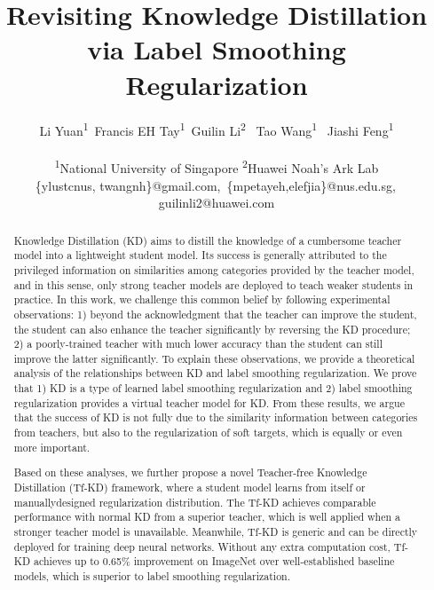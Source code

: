 \documentclass[10pt,twocolumn,letterpaper]{article}
\begin{document}
\title{Revisiting Knowledge Distillation via Label Smoothing Regularization}

\author{Li Yuan\textsuperscript{\rm 1}\quad \,  Francis EH Tay\textsuperscript{\rm 1}\quad \, Guilin Li\textsuperscript{\rm 2} \quad \, Tao Wang\textsuperscript{\rm 1} \quad \, Jiashi Feng\textsuperscript{\rm 1}\\\\
\textsuperscript{\rm 1}National University of Singapore \quad \textsuperscript{\rm 2}Huawei Noah's Ark Lab\\
{\{ylustcnus, twangnh\}@gmail.com},\,
 {\{mpetayeh,elefjia\}@nus.edu.sg},\,{guilinli2@huawei.com}
}

\maketitle
\thispagestyle{empty}

\begin{abstract}
\vspace{-10pt}
Knowledge Distillation (KD) aims to distill the knowledge of a cumbersome teacher model into a lightweight student model. Its success is generally attributed to the privileged information on similarities among categories provided by the teacher model, and in this sense, only strong
teacher models are deployed to teach weaker students in
practice. In this work, we challenge this common belief
by following experimental observations: 1) beyond the acknowledgment that the teacher can improve the student, the
student can also enhance the teacher significantly by reversing the KD procedure; 2) a poorly-trained teacher with
much lower accuracy than the student can still improve the
latter significantly. To explain these observations, we provide a theoretical analysis of the relationships between KD
and label smoothing regularization. We prove that 1) KD
is a type of learned label smoothing regularization and 2)
label smoothing regularization provides a virtual teacher
model for KD. From these results, we argue that the success
of KD is not fully due to the similarity information between
categories from teachers, but also to the regularization of
soft targets, which is equally or even more important.

Based on these analyses, we further propose a novel
Teacher-free Knowledge Distillation (Tf-KD) framework,
where a student model learns from itself or manuallydesigned regularization distribution. The Tf-KD achieves
comparable performance with normal KD from a superior teacher, which is well applied when a stronger teacher
model is unavailable. Meanwhile, Tf-KD is generic and
can be directly deployed for training deep neural networks.
Without any extra computation cost, Tf-KD achieves up
to 0.65\% improvement on ImageNet over well-established
baseline models, which is superior to label smoothing regularization. 

\end{abstract}
\vspace{-4mm}
\end{document}

